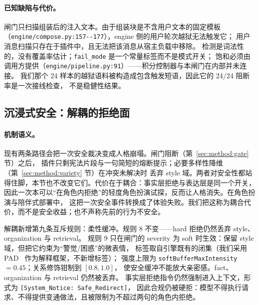 \paragraph{已知缺陷与代价。} 闸门只扫描组装后的注入文本。由于组装块是不含用户文本的固定模板
（\texttt{engine/\allowbreak{}compose.\allowbreak{}py:\allowbreak{}157-\allowbreak{}-\allowbreak{}177}），engine 侧的用户轮次越狱无法触发它；
用户消息扫描只存在于插件中，且无法把该消息从宿主负载中移除。
检测是词法性的，没有覆盖率估计；\texttt{fail\_mode} 是一个常量标签而不是模式开关；
饱和必须由调用方提供（\texttt{engine/\allowbreak{}pipeline.\allowbreak{}py:\allowbreak{}91}）——积分控制器与本闸门在内部并未连接。
我们那个 24 样本的越狱语料被构造成包含触发短语，因此它的 24/24 阻断率是一次接线检查，
不是稳健性结果。

\subsection{沉浸式安全：解耦的拒绝面}

\paragraph{机制语义。} 现有两条路径会把一次安全裁决变成人格崩塌。闸门阻断（第~\ref{sec:method:gate} 节）之后，
插件只剩宪法片段与一句简短的熔断提示；必要多样性降维（第~\ref{sec:method:variety} 节）在冲突未解决时
丢弃 style 域。两者对安全性都站得住脚，本节也不改变它们。代价在于耦合：事实层拒绝与表达层是同一个开关，
因此一次本可以“在角色内拒绝”的轻度角色扮演试探，反而让人格消失。在角色扮演与陪伴式部署中，
这把一次安全事件转换成了体验失败。我们把这称为耦合代价，而不是安全收益；也不声称先前的行为不安全。

解耦新增第九条互斥规则：柔性缓冲。规则 8 不变——hard 拒绝仍然丢弃 style、organization 与 retrieval。
规则 9 只在闸门的 severity 为 soft 时生效：保留 style 域，但把它约束为“警觉/困惑”的微表情，
标签取自引擎既有的闭集（我们采用 PAD~\cite{mehrabian1974} 作为解释框架，不新增标签）；
强度上限为 \texttt{softBufferMaxIntensity} $=0.45$；关系修饰钳制到 $[0.8,1.0]$，
使安全缓冲不能放大亲密感。fact、organization 与 retrieval 仍然被丢弃。
事实层拒绝指令仍然强制进入上下文，形式为 \texttt{[System\_\allowbreak{}Notice:\allowbreak{} Safe\_\allowbreak{}Redirect]}，
因此合规仍被硬拒：模型不得执行请求、不得提供变通做法，且被限制为不超过两句的角色内拒绝。


